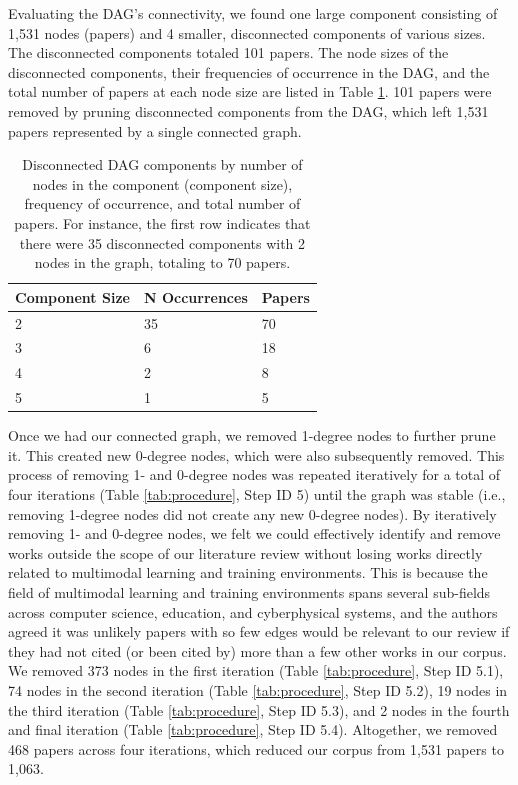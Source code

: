 \documentclass[manuscript,screen,review]{acmart}
\begin{document}
Evaluating the DAG's connectivity, we found one large component consisting of 1,531 nodes (papers) and 4 smaller, disconnected components of various sizes. The disconnected components totaled 101 papers. The node sizes of the disconnected components, their frequencies of occurrence in the DAG, and the total number of papers at each node size are listed in Table \ref{tab:disconnected}. 101 papers were removed by pruning disconnected components from the DAG, which left 1,531 papers represented by a single connected graph. 

\begin{table}[htbp]
    \renewcommand{\arraystretch}{1.3}%
    \centering
    \caption{Disconnected DAG components by number of nodes in the component (component size), frequency of occurrence, and total number of papers. For instance, the first row indicates that there were 35 disconnected components with 2 nodes in the graph, totaling to 70 papers.}
    \begin{tabularx}{0.5\linewidth}{l@{\hskip .25in} l@{\hskip .25in} l@{\hskip .25in}}
        Component Size & N Occurrences & Papers \\
        \midrule
        
        2    &  35 &  70\\
        \midrule
        
        3    &  6  &  18\\
        \midrule
        
        4    &  2  &  8\\
        \midrule
        
        5    &  1  &  5\\

        \bottomrule
    \end{tabularx}
    \label{tab:disconnected}
\end{table}

Once we had our connected graph, we removed 1-degree nodes to further prune it. This created new 0-degree nodes, which were also subsequently removed. This process of removing 1- and 0-degree nodes was repeated iteratively for a total of four iterations (Table \ref{tab:procedure}, Step ID 5) until the graph was stable (i.e., removing 1-degree nodes did not create any new 0-degree nodes). By iteratively removing 1- and 0-degree nodes, we felt we could effectively identify and remove works outside the scope of our literature review without losing works directly related to multimodal learning and training environments. This is because the field of multimodal learning and training environments spans several sub-fields across computer science, education, and cyberphysical systems, and the authors agreed it was unlikely papers with so few edges would be relevant to our review if they had not cited (or been cited by) more than a few other works in our corpus. We removed 373 nodes in the first iteration (Table \ref{tab:procedure}, Step ID 5.1), 74 nodes in the second iteration (Table \ref{tab:procedure}, Step ID 5.2), 19 nodes in the third iteration (Table \ref{tab:procedure}, Step ID 5.3), and 2 nodes in the fourth and final iteration (Table \ref{tab:procedure}, Step ID 5.4). Altogether, we removed 468 papers across four iterations, which reduced our corpus from 1,531 papers to 1,063. 
\end{document}
